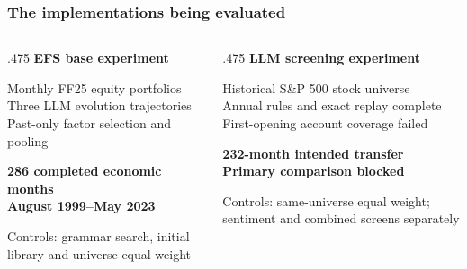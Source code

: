 \documentclass[aspectratio=169,10pt,xcolor=table]{beamer}
\begin{document}
\begin{frame}[t]
\frametitle{The implementations being evaluated}
\relax
\begin{columns}[T,onlytextwidth]
\begin{column}{.475\textwidth}
{\normalsize\color{Teal}\bfseries EFS base experiment}\par\medskip
{\small\color{Ink} Monthly FF25 equity portfolios\\ Three LLM evolution trajectories\\ Past-only factor selection and pooling}\par\medskip
\vspace{.12cm}
{\small\color{Ink}\bfseries 286 completed economic months\\ August 1999--May 2023}\par\medskip
{\scriptsize\color{Muted} Controls: grammar search, initial library and universe equal weight}\par\medskip
\end{column}
\begin{column}{.475\textwidth}
{\normalsize\color{Teal}\bfseries LLM screening experiment}\par\medskip
{\small\color{Ink} Historical S\&P 500 stock universe\\ Annual rules and exact replay complete\\ First-opening account coverage failed}\par\medskip
\vspace{.12cm}
{\small\color{Ink}\bfseries 232-month intended transfer\\ Primary comparison blocked}\par\medskip
{\scriptsize\color{Muted} Controls: same-universe equal weight; sentiment and combined screens separately}\par\medskip
\end{column}
\end{columns}
\end{frame}
\end{document}

